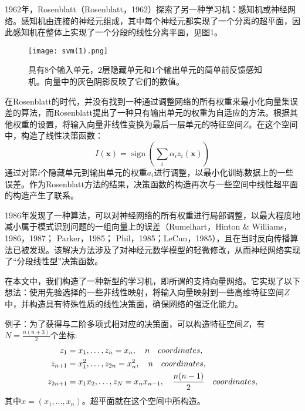 \documentclass[lang=cn,11pt,a4paper]{elegantpaper}
\begin{document}
	1962年，Rosenblatt（Rosenblatt，1962）探索了另一种学习机：感知机或神经网络。感知机由连接的神经元组成，其中每个神经元都实现了一个分离的超平面，因此感知机在整体上实现了一个分段的线性分离平面，见图1。
	\begin{figure}[htbp]
		\centering
		\texttt{[image: svm(1).png]}
		\caption{具有$8$个输入单元，$2$层隐藏单元和$1$个输出单元的简单前反馈感知机。向量中的灰色阴影反映了它们的数值。}
	\end{figure}
	在Rosenblatt的时代，并没有找到一种通过调整网络的所有权重来最小化向量集误差的算法，而Rosenblatt提出了一种只有输出单元的权重为自适应的方法。根据其他权重的设置，将输入向量非线性变换为最后一层单元的特征空间$Z$。在这个空间中，构造了线性决策函数：
	\begin{equation}
		I(\mathbf{x})=\operatorname{sign}\left(\sum_{i} \alpha_{i} z_{i}(\mathbf{x})\right)\tag{4}
	\end{equation}
	通过对第$i$个隐藏单元到输出单元的权重$a_i$进行调整，以最小化训练数据上的一些误差。作为Rosenblatt方法的结果，决策函数的构造再次与一些空间中线性超平面的构造产生了联系。

	1986年发现了一种算法，可以对神经网络的所有权重进行局部调整，以最大程度地减小属于模式识别问题的一组向量上的误差（Rumelhart，Hinton \& Williams，1986，1987； Parker，1985； Phil，1985；LeCun，1985），且在当时反向传播算法已被发现。该解决方法涉及了对神经元数学模型的轻微修改，从而神经网络实现了“分段线性型”决策函数。

	在本文中，我们构造了一种新型的学习机，即所谓的支持向量网络。它实现了以下想法：使用先验选择的一些非线性映射，将输入向量映射到一些高维特征空间$Z$中，并构造具有特殊性质的线性决策面，确保网络的强泛化能力。

	例子：为了获得与二阶多项式相对应的决策面，可以构造特征空间$Z$，有$N=\frac{n(n+3)}{2}$个坐标:
	\begin{align}
		z_{1}&=x_{1},\ldots,z_{n}=x_{n},\quad n \quad coordinates, \notag \\ 
		z_{n+1}&=x_{1}^{2},\ldots,z_{2n}=x_{n}^{2},\quad n\quad coordinates, \notag \\
		z_{2n+1}&=x_{1} x_{2},\ldots,z_{N}=x_{n} x_{n-1},\quad \frac{n(n-1)}{2} \quad coordinates,\notag
	\end{align}
	其中$x=(x_1,\ldots,x_n)$。超平面就在这个空间中所构造。
\end{document}
